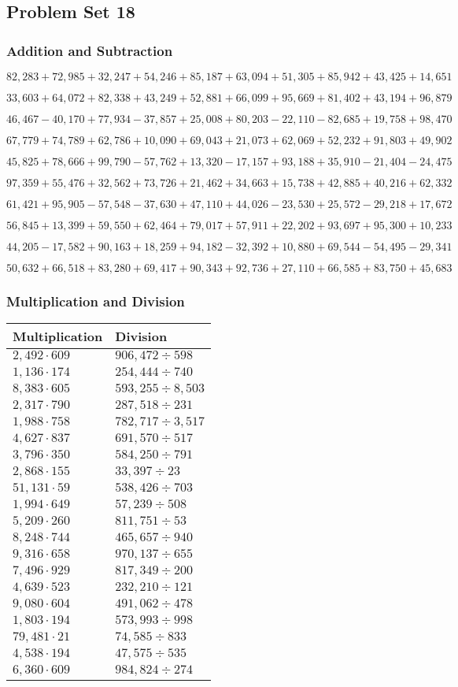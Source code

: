\hypertarget{problem-set-18-4}{%
\subsection{Problem Set 18}\label{problem-set-18-4}}

\hypertarget{addition-and-subtraction-240}{%
\subsubsection{Addition and
Subtraction}\label{addition-and-subtraction-240}}

\(82,283+72,985+32,247+54,246+85,187+63,094+51,305+85,942+43,425+ 14,651\)

\(33,603+64,072+82,338+43,249+52,881+66,099+95,669+81,402+43,194+96,879\)

\(46,467-40,170+77,934-37,857+25,008+80,203-22,110-82,685+19,758+98,470\)

\(67,779+74,789+62,786+10,090+69,043+21,073+62,069+52,232+91,803+49,902\)

\(45,825+78,666+99,790-57,762+13,320-17,157+93,188+35,910-21,404-24,475\)

\(97,359+55,476+32,562+73,726+21,462+34,663+15,738+42,885+40,216+62,332\)

\(61,421+95,905-57,548-37,630+47,110+44,026-23,530+25,572-29,218+17,672\)

\(56,845+13,399+59,550+62,464+79,017+57,911+22,202+93,697+95,300+10,233\)

\(44,205-17,582+90,163+18,259+94,182-32,392+10,880+69,544-54,495-29,341\)

\(50,632+66,518+83,280+69,417+90,343+92,736+27,110+66,585+83,750+45,683\)

\hypertarget{multiplication-and-division-239}{%
\subsubsection{Multiplication and
Division}\label{multiplication-and-division-239}}

\begin{longtable}[]{@{}ll@{}}
\toprule
Multiplication & Division\tabularnewline
\midrule
\endhead
\(2,492\cdot609\) & \(906,472÷598\)\tabularnewline
\(1,136\cdot174\) & \(254,444÷740\)\tabularnewline
\(8,383\cdot605\) & \(593,255÷8,503\)\tabularnewline
\(2,317\cdot790\) & \(287,518÷231\)\tabularnewline
\(1,988\cdot758\) & \(782,717÷3,517\)\tabularnewline
\(4,627\cdot837\) & \(691,570÷517\)\tabularnewline
\(3,796\cdot350\) & \(584,250÷791\)\tabularnewline
\(2,868\cdot155\) & \(33,397÷23\)\tabularnewline
\(51,131\cdot59\) & \(538,426÷703\)\tabularnewline
\(1,994\cdot649\) & \(57,239÷508\)\tabularnewline
\(5,209\cdot260\) & \(811,751÷53\)\tabularnewline
\(8,248\cdot744\) & \(465,657÷940\)\tabularnewline
\(9,316\cdot658\) & \(970,137÷655\)\tabularnewline
\(7,496\cdot929\) & \(817,349÷200\)\tabularnewline
\(4,639\cdot523\) & \(232,210÷121\)\tabularnewline
\(9,080\cdot604\) & \(491,062÷478\)\tabularnewline
\(1,803\cdot194\) & \(573,993÷998\)\tabularnewline
\(79,481\cdot21\) & \(74,585÷833\)\tabularnewline
\(4,538\cdot194\) & \(47,575÷535\)\tabularnewline
\(6,360\cdot609\) & \(984,824÷274\)\tabularnewline
\bottomrule
\end{longtable}

